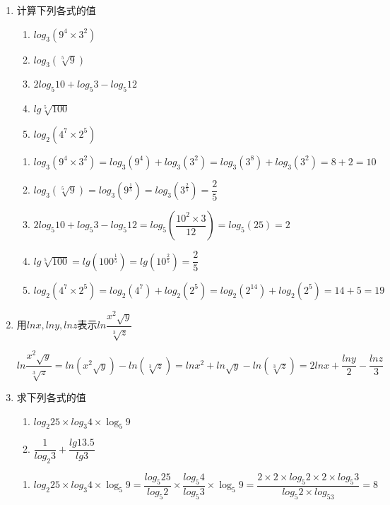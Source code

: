 \begin{enumerate}
    \item 计算下列各式的值
    \begin{enumerate}
        \item $log_3{(9^4 \times 3^2)}$
        \item $log_3{(\sqrt[5]{9})}$
        \item $2 log_5{10} + log_5{3} - log_5{12}$
        \item $lg\sqrt[5]{100}$
        \item $log_2{(4^7 \times 2^5)}$
    \end{enumerate}
    \begin{jieda}
        \begin{enumerate}
            \item $log_3{(9^4 \times 3^2)} = log_3(9^4) + log_3(3^2) = log_3(3^8) + log_3(3^2) = 8+2 = 10$
            \item $log_3{(\sqrt[5]{9})} = log_3(9^{\frac{1}{5}}) = log_3(3^{\frac{2}{5}}) = \dfrac{2}{5}$
            \item $2log_5{10} + log_5{3} - log_5{12} = log_5\left(\dfrac{10^2 \times 3}{12}\right) = log_5(25) = 2$
            \item $lg\sqrt[5]{100} = lg(100^{\frac{1}{5}}) = lg(10^{\frac{2}{5}}) = \dfrac{2}{5}$
            \item $log_2{(4^7 \times 2^5)} = log_2(4^7) + log_2(2^5) = log_2(2^{14}) + log_2(2^5) = 14+5 = 19$
        \end{enumerate}
    \end{jieda}
    \item 用$lnx, lny, lnz$表示$ln{\dfrac{x^2\sqrt{y}}{\sqrt[3]{z}}}$
    \begin{jieda}
        $ln{\dfrac{x^2\sqrt{y}}{\sqrt[3]{z}}} = ln(x^2\sqrt{y}) - ln(\sqrt[3]{z}) = ln{x^2} + ln{\sqrt{y}} - ln(\sqrt[3]{z}) = 2lnx + \dfrac{lny}{2} - \dfrac{lnz}{3}$
    \end{jieda}
    \item 求下列各式的值
    \begin{enumerate}
        \item $log_2{25} \times log_3{4} \times \log_5{9}$
        \item $\dfrac{1}{log_2{3}} + \dfrac{lg13.5}{lg3}$
    \end{enumerate}
    \begin{jieda}
        \begin{enumerate}
            \item $log_2{25} \times log_3{4} \times \log_5{9} = \dfrac{log_5{25}}{log_5{2}} \times \dfrac{log_5{4}}{log_5{3}} \times \log_5{9} = \dfrac{2 \times 2 \times log_5{2} \times 2 \times log_5{3}}{log_5{2} \times log_53} = 8$

\end{enumerate}
\end{jieda}
\end{enumerate}
